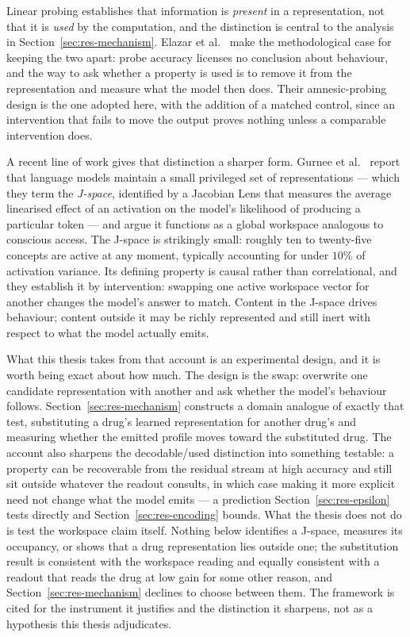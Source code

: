 Linear probing establishes that information is \emph{present} in a representation, not that it is
\emph{used} by the computation, and the distinction is central to the analysis in
Section~\ref{sec:res-mechanism}. Elazar et al.~\cite{gurnee} make the methodological case for
keeping the two apart: probe accuracy licenses no conclusion about behaviour, and the way to ask
whether a property is used is to remove it from the representation and measure what the model then
does. Their amnesic-probing design is the one adopted here, with the addition of a matched control,
since an intervention that fails to move the output proves nothing unless a comparable intervention
does.

A recent line of work gives that distinction a sharper form. Gurnee et al.~\cite{workspace} report
that language models maintain a small privileged set of representations --- which they term the
\emph{J-space}, identified by a Jacobian Lens that measures the average linearised effect of an
activation on the model's likelihood of producing a particular token --- and argue it functions as a
global workspace analogous to conscious access. The J-space is strikingly small: roughly ten to
twenty-five concepts are active at any moment, typically accounting for under $10\%$ of activation
variance. Its defining property is causal rather than correlational, and they establish it by
intervention: swapping one active workspace vector for another changes the model's answer to match.
Content in the J-space drives behaviour; content outside it may be richly represented and still
inert with respect to what the model actually emits.

What this thesis takes from that account is an experimental design, and it is worth being exact
about how much. The design is the swap: overwrite one candidate representation with another and ask
whether the model's behaviour follows. Section~\ref{sec:res-mechanism} constructs a domain analogue
of exactly that test, substituting a drug's learned representation for another drug's and measuring
whether the emitted profile moves toward the substituted drug. The account also sharpens the
decodable/used distinction into something testable: a property can be recoverable from the residual
stream at high accuracy and still sit outside whatever the readout consults, in which case making it
more explicit need not change what the model emits --- a prediction
Section~\ref{sec:res-epsilon} tests directly and Section~\ref{sec:res-encoding} bounds. What the thesis does not do is test the workspace claim itself.
Nothing below identifies a J-space, measures its occupancy, or shows that a drug representation
lies outside one; the substitution result is consistent with the workspace reading and equally
consistent with a readout that reads the drug at low gain for some other reason, and
Section~\ref{sec:res-mechanism} declines to choose between them. The framework is cited for the
instrument it justifies and the distinction it sharpens, not as a hypothesis this thesis
adjudicates.

